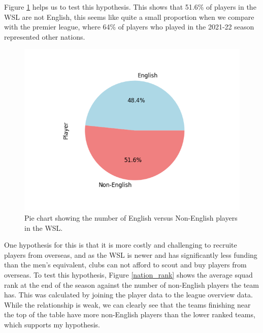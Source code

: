\documentclass[12pt, a4paper, twocolumn]{article}
\begin{document}
Figure \ref{nation_pie} helps us to test this hypothesis. This shows that 51.6\% of players in the WSL are not English, this seems like quite a small proportion when we compare with the premier league, where 64\% of players who played in the 2021-22 season represented other nations\cite{foreign}. 

\begin{figure}
  \includegraphics[width=\linewidth]{../vis/playerStats/nation_pie.png}
  \caption{Pie chart showing the number of English versus Non-English players in the WSL.}
  \label{nation_pie}
\end{figure}

One hypothesis for this is that it is more costly and challenging to recruite players from overseas, and as the WSL is newer and has significantly less funding than the men's equivalent, clubs can not afford to scout and buy players from overseas. To test this hypothesis, Figure \ref{nation_rank} shows the average squad rank at the end of the season against the number of non-English players the team has. This was calculated by joining the player data to the league overview data. While the relationship is weak, we can clearly see that the teams finishing near the top of the table have more non-English players than the lower ranked teams, which supports my hypothesis.
\end{document}
